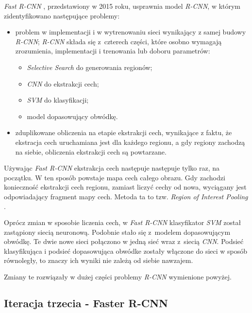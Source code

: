 
\textit{Fast R-CNN} \cite{fast-rcnn}, przedstawiony w 2015 roku, usprawnia model \textit{R-CNN}, w którym zidentyfikowano następujące problemy:

\begin{itemize}
  \item problem w implementacji i w wytrenowaniu sieci wynikający z samej budowy \textit{R-CNN}; \textit{R-CNN} składa się z~czterech części, które osobno wymagają zrozumienia, implementacji i trenowania lub doboru parametrów:
		\begin{itemize}
			\item \textit{Selective Search} do generowania regionów;
			\item \textit{CNN} do ekstrakcji cech;
			\item \textit{SVM} do klasyfikacji;
			\item model dopasowujący obwódkę.
		\end{itemize}
  \item zduplikowane obliczenia na etapie ekstrakcji cech, wynikające z faktu, że ekstracja cech uruchamiana jest dla każdego regionu, a gdy regiony zachodzą na siebie, obliczenia ekstrakcji cech są powtarzane.
\end{itemize}

Używając \textit{Fast R-CNN} ekstrakcja cech następuje następuje tylko raz, na początku.
W ten sposób powstaje mapa cech całego obrazu.
Gdy zachodzi konieczność ekstrakcji cech regionu, zamiast liczyć cechy od nowa, wyciągany jest odpowiadający fragment mapy cech.
Metoda ta to tzw. \textit{Region of Interest Pooling} \cite{region-of-interest-pooling}.

Oprócz zmian w sposobie liczenia cech, w \textit{Fast R-CNN} klasyfikator \textit{SVM} został zastąpiony siecią neuronową.
Podobnie stało się z~modelem dopasowującym obwódkę.
Te dwie nowe sieci połączono w jedną sieć wraz z~siecią \textit{CNN}.
Podsieć klasyfikująca i podsieć dopasowująca obwódke zostały włączone do sieci w sposób równoległy, to znaczy ich wyniki nie zależą od siebie nawzajem.

Zmiany te rozwiązały w dużej części problemy \textit{R-CNN} wymienione powyżej.

\subsection{Iteracja trzecia - Faster R-CNN}

